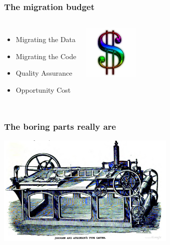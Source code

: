 \documentclass{beamer}
\begin{document}
\begin{frame}[fragile]
  \frametitle{The migration budget}
  
  \vfill

\begin{columns}

  \begin{itemize}
  \item Migrating the Data
  \item Migrating the Code
  \item Quality Assurance
  \item Opportunity Cost
  \end{itemize}  

\begin{center}
  \includegraphics[height=7em]{Dollar-sign.jpg}
\end{center}
\end{columns}
\end{frame}

\begin{frame}
  \frametitle{The boring parts really are}

  
  \begin{center}
    \includegraphics[height=2.1in]{type-casting-machine.jpg}
  \end{center}
\end{frame}
\end{document}
